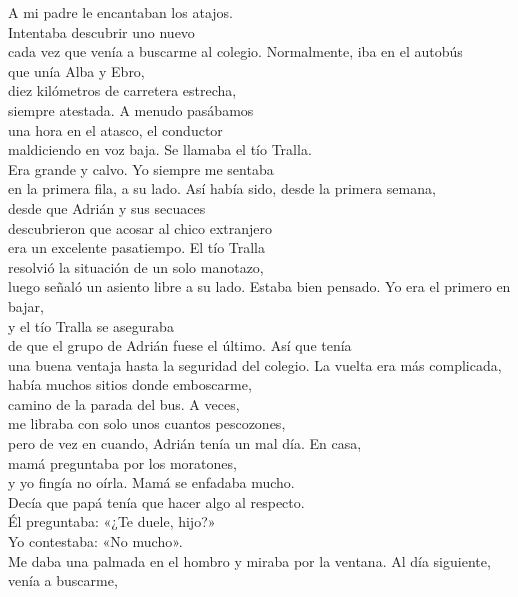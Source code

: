 \begin{versopropio}
A mi padre le encantaban los atajos.\\
Intentaba descubrir uno nuevo\\
cada vez que venía a buscarme al colegio.
\stanzabreak
Normalmente, iba en el autobús\\
que unía Alba y Ebro,\\
diez kilómetros de carretera estrecha,\\
siempre atestada. A menudo pasábamos\\
una hora en el atasco, el conductor\\
maldiciendo en voz baja.
\stanzabreak
Se llamaba el tío Tralla.\\
Era grande y calvo. Yo siempre me sentaba\\
en la primera fila, a su lado.
\stanzabreak
Así había sido, desde la primera semana,\\
desde que Adrián y sus secuaces\\
descubrieron que acosar al chico extranjero\\
era un excelente pasatiempo. El tío Tralla\\
resolvió la situación de un solo manotazo,\\
luego señaló un asiento libre a su lado.
\stanzabreak
Estaba bien pensado. Yo era el primero en bajar,\\
y el tío Tralla se aseguraba\\
de que el grupo de Adrián fuese el último. Así que tenía\\
una buena ventaja hasta la seguridad del colegio.
\stanzabreak
La vuelta era más complicada,\\
había muchos sitios donde emboscarme,\\
camino de la parada del bus. A veces,\\
me libraba con solo unos cuantos pescozones,\\
pero de vez en cuando, Adrián tenía un mal día.
\stanzabreak
En casa,\\
mamá preguntaba por los moratones,\\
y yo fingía no oírla. Mamá se enfadaba mucho.\\
Decía que papá tenía que hacer algo al respecto.\\
Él preguntaba: «¿Te duele, hijo?»\\
Yo contestaba: «No mucho».\\
Me daba una palmada en el hombro y miraba por la ventana.
\stanzabreak
Al día siguiente, venía a buscarme,\\

\end{versopropio}
